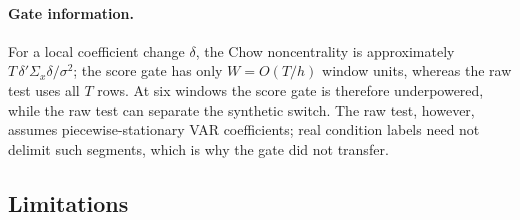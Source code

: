 \documentclass[sigconf,anonymous]{acmart}
\begin{document}
\paragraph{Gate information.}
For a local coefficient change $\delta$, the Chow noncentrality is approximately $T\,\delta'\Sigma_x\delta/\sigma^2$; the score gate has only $W=O(T/h)$ window units, whereas the raw test uses all $T$ rows.
At six windows the score gate is therefore underpowered, while the raw test can separate the synthetic switch.
The raw test, however, assumes piecewise-stationary VAR coefficients; real condition labels need not delimit such segments, which is why the gate did not transfer.

\subsection{Limitations}
\end{document}
